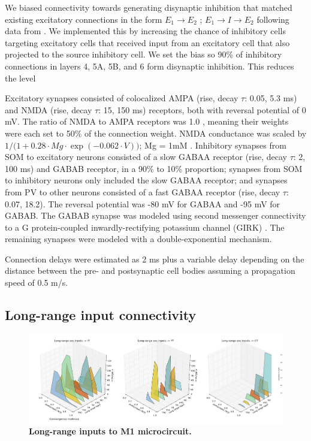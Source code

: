We biased connectivity towards generating disynaptic inhibition that matched existing excitatory connections in the form $E_1 \rightarrow E_2$ ; $E_1 \rightarrow I \rightarrow E_2$ following data from \cite{Yama15b}. We implemented this by increasing the chance of inhibitory cells targeting excitatory cells that received input from an excitatory cell that also projected to the source inhibitory cell. We set the bias so 90\% of inhibitory connections in layers 4, 5A, 5B, and 6 form disynaptic inhibition. This reduces the level 

Excitatory synapses consisted of colocalized AMPA (rise, decay $\tau$: 0.05, 5.3 ms) and NMDA (rise, decay $\tau$: 15, 150 ms) receptors, both with reversal potential of 0 mV. The ratio of NMDA to AMPA receptors was 1.0 \cite{Myme03}, meaning their weights were each set to 50\% of the connection weight. NMDA conductance was scaled by $1/(1 + 0.28 · Mg · \exp{(−0.062 · V))}$; Mg = 1mM \cite{jahr1990voltage}. Inhibitory synapses from SOM to excitatory neurons consisted of a slow GABAA receptor (rise, decay $\tau$: 2, 100 ms) and GABAB receptor, in a 90\% to 10\% proportion; synapses from SOM to inhibitory neurons only included the slow GABAA receptor; and synapses from PV to other neurons consisted of a fast GABAA receptor (rise, decay $\tau$: 0.07, 18.2). The reversal potential was -80 mV for GABAA and -95 mV for GABAB. The GABAB synapse was modeled using second messenger connectivity to a G protein-coupled inwardly-rectifying potassium channel (GIRK) \cite{destexhe96a}. The remaining synapses were modeled with a double-exponential mechanism. 

Connection delays were estimated as 2 ms plus a variable delay depending on the distance between the pre- and postsynaptic cell bodies assuming a propagation speed of 0.5 m/s.


\subsection{Long-range input connectivity}

\begin{figure}[!h]  %
\centering
\includegraphics[width=\textwidth]{figs/conn_long.png}
\caption{{\bf Long-range inputs to M1 microcircuit.}
}
\label{fig_conn_long}
\end{figure}

